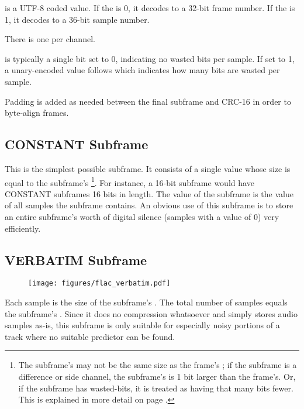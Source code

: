 \noindent
{} is a UTF-8 coded value.
If the  is 0, it decodes to a 32-bit frame number.
If the  is 1, it decodes to a 36-bit sample number.

There is one  per channel.

 is typically a single bit set to 0, indicating
no wasted bits per sample.  If set to 1, a unary-encoded value
follows which indicates how many bits are wasted per sample.

Padding is added as needed between the final subframe and CRC-16
in order to byte-align frames.

\pagebreak

\subsection{CONSTANT Subframe}

This is the simplest possible subframe.
It consists of a single value whose size is equal to the subframe's
\footnote{
The subframe's  may not be the same size as the frame's
;
if the subframe is a difference or side channel, the subframe's
 is 1 bit larger than the frame's.
Or, if the subframe has wasted-bits, it is treated as having
that many bits fewer.
This is explained in more detail on page \pageref{flac_channels}.}.
For instance, a 16-bit subframe would have CONSTANT subframes
16 bits in length.
The value of the subframe is the value of all samples the subframe
contains.
An obvious use of this subframe is to store an entire subframe's worth
of digital silence (samples with a value of 0) very efficiently.

\subsection{VERBATIM Subframe}

\begin{figure}[h]
\texttt{[image: figures/flac\_verbatim.pdf]}
\end{figure}
\noindent
Each sample is the size of the subframe's .
The total number of samples equals the subframe's .
Since it does no compression whatsoever and simply stores
audio samples as-is, this subframe is only suitable for especially
noisy portions of a track where no suitable predictor can be found.

